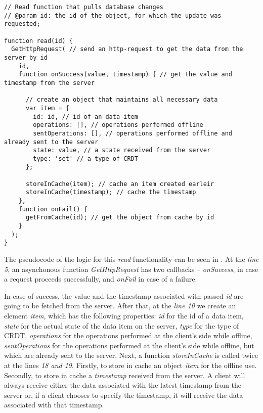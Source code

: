 \begin{lstlisting}[caption={Pseudocode for requesting the data: client.}, label={lst:read1}]
// Read function that pulls database changes
// @param id: the id of the object, for which the update was requested;

function read(id) {
  GetHttpRequest( // send an http-request to get the data from the server by id
    id,
    function onSuccess(value, timestamp) { // get the value and timestamp from the server

      // create an object that maintains all necessary data
      var item = {
        id: id, // id of an data item
        operations: [], // operations performed offline
        sentOperations: [], // operations performed offline and already sent to the server
        state: value, // a state received from the server
        type: 'set' // a type of CRDT
      }; 

      storeInCache(item); // cache an item created earleir
      storeInCache(timestamp); // cache the timestamp
    },
    function onFail() {
      getFromCache(id); // get the object from cache by id
    }
  );
}
\end{lstlisting} 

The pseudocode of the logic for this \textit{read} functionality can be seen in . At the \textit{line 5}, an asynchonous function \textit{GetHttpRequest} has two callbacks -- \textit{onSuccess}, in case a request proceeds successfully, and \textit{onFail} in case of a failure. 

In case of success, the value and the timestamp associated with passed \textit{id} are going to be fetched from the server. After that, at the \textit{line 10} we create an element \textit{item}, which has the following properties: \textit{id} for the id of a data item, \textit{state} for the actual state of the data item on the server, \textit{type} for the type of CRDT, \textit{operations} for the operations performed at the client's side while offline, \textit{sentOperations} for the operations performed at the client's side while offline, but which are already sent to the server. Next, a function \textit{storeInCache} is called twice at the lines \textit{18 and 19}. Firstly, to store in cache an object \textit{item} for the offline use. Secondly, to store in cache a \textit{timestamp} received from the server.  A client will always receive either the data associated with the latest timestamp from the server or, if a client chooses to specify the timestamp, it will receive the data associated with that timestamp. 

